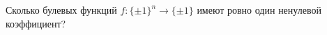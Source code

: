 Сколько булевых функций $f\colon \{\pm 1\}^n \to \{\pm 1\}$ имеют ровно один ненулевой коэффициент?
